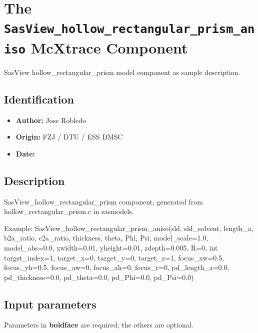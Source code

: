 \section{The \texttt{SasView\_hollow\_rectangular\_prism\_aniso} McXtrace Component}
SasView hollow\_rectangular\_prism model component as sample description.

\subsection*{Identification}
\begin{itemize}
  \item \textbf{Author:} Jose Robledo
  \item \textbf{Origin:} FZJ / DTU / ESS DMSC
  \item \textbf{Date:} 
\end{itemize}

\subsection*{Description}
SasView\_hollow\_rectangular\_prism component, generated from hollow\_rectangular\_prism.c in sasmodels.

Example: SasView\_hollow\_rectangular\_prism\_aniso(sld, sld\_solvent, length\_a, b2a\_ratio, c2a\_ratio, thickness, theta, Phi, Psi, model\_scale=1.0, model\_abs=0.0, xwidth=0.01, yheight=0.01, zdepth=0.005, R=0, int target\_index=1, target\_x=0, target\_y=0, target\_z=1, focus\_xw=0.5, focus\_yh=0.5, focus\_aw=0, focus\_ah=0, focus\_r=0, pd\_length\_a=0.0, pd\_thickness=0.0, pd\_theta=0.0, pd\_Phi=0.0, pd\_Psi=0.0)

\subsection*{Input parameters}
Parameters in \textbf{boldface} are required; the others are optional.

